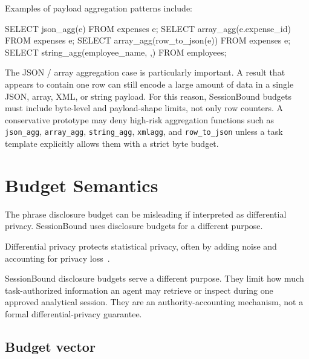 \documentclass[journal]{IEEEtran}
\newenvironment{Shaded}{}{}
\newcommand{\KeywordTok}[1]{\textcolor[rgb]{0.00,0.44,0.13}{#1}}
\newcommand{\NormalTok}[1]{#1}
\newcommand{\StringTok}[1]{\textcolor[rgb]{0.25,0.44,0.63}{#1}}
\newcounter{algorithm}
\begin{document}
Examples of payload aggregation patterns include:

\begin{Shaded}
\begin{Highlighting}[]
\KeywordTok{SELECT}\NormalTok{ json\_agg(e) }\KeywordTok{FROM}\NormalTok{ expenses e;}
\KeywordTok{SELECT}\NormalTok{ array\_agg(e.expense\_id) }\KeywordTok{FROM}\NormalTok{ expenses e;}
\KeywordTok{SELECT}\NormalTok{ array\_agg(row\_to\_json(e)) }\KeywordTok{FROM}\NormalTok{ expenses e;}
\KeywordTok{SELECT}\NormalTok{ string\_agg(employee\_name, }\StringTok{\textquotesingle{},\textquotesingle{}}\NormalTok{) }\KeywordTok{FROM}\NormalTok{ employees;}
\end{Highlighting}
\end{Shaded}

The JSON / array aggregation case is particularly important. A result
that appears to contain one row can still encode a large amount of data
in a single JSON, array, XML, or string payload. For this reason,
SessionBound budgets must include byte-level and payload-shape limits,
not only row counters. A conservative prototype may deny high-risk
aggregation functions such as \texttt{json\_agg}, \texttt{array\_agg},
\texttt{string\_agg}, \texttt{xmlagg}, and \texttt{row\_to\_json} unless
a task template explicitly allows them with a strict byte budget.


\hypertarget{budget-semantics}{%
\section{Budget Semantics}\label{budget-semantics}}

The phrase disclosure budget can be misleading if interpreted
as differential privacy. SessionBound uses disclosure budgets for a
different purpose.

Differential privacy protects statistical privacy, often by adding noise
and accounting for privacy loss~\cite{dwork2014algorithmic}.

SessionBound disclosure budgets serve a different purpose. They limit
how much task-authorized information an agent may retrieve or inspect
during one approved analytical session. They are an authority-accounting
mechanism, not a formal differential-privacy guarantee.

\hypertarget{budget-vector}{%
\subsection{Budget vector}\label{budget-vector}}
\end{document}
